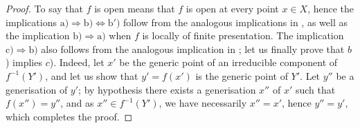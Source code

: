\begin{proof}
To say that $f$ is open means that $f$ is open at every point $x\in X$, hence the implications $\mathrm{a)}\Rightarrow\mathrm{b)}\Leftrightarrow\mathrm{b')}$ follow from the analogous implications in , as well as the implication $\mathrm{b)}\Rightarrow\mathrm{a)}$ when $f$ is locally of finite presentation.
The implication $\mathrm{c)}\Rightarrow\mathrm{b)}$ also follows from the analogous implication in ; let us finally prove that $b$) implies $c$).
Indeed, let $x'$ be the generic point of an irreducible component of $f^{-1}(Y')$, and let us show that $y'=f(x')$ is the generic point of $Y'$.
Let $y''$ be a generisation of $y'$; by hypothesis there exists a generisation $x''$ of $x'$ such that $f(x'')=y''$, and as $x''\in f^{-1}(Y')$, we have necessarily $x''=x'$, hence $y''=y'$, which completes the proof.
\end{proof}
